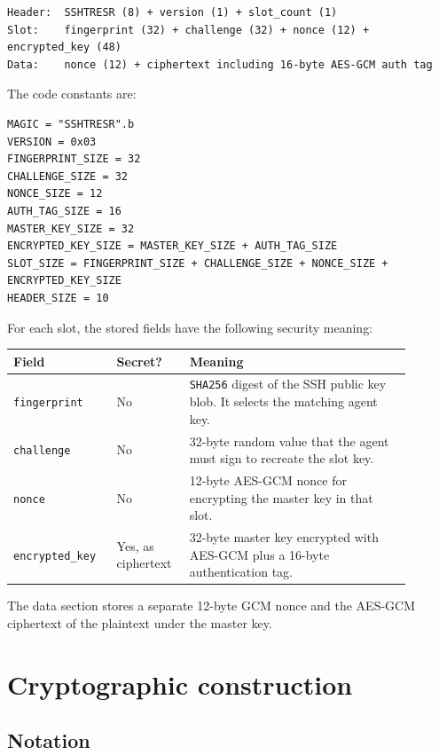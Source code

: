\documentclass[11pt]{article}
\theoremstyle{definition}
\theoremstyle{plain}
\begin{document}
\begin{lstlisting}[style=textcode]
Header:  SSHTRESR (8) + version (1) + slot_count (1)
Slot:    fingerprint (32) + challenge (32) + nonce (12) + encrypted_key (48)
Data:    nonce (12) + ciphertext including 16-byte AES-GCM auth tag
\end{lstlisting}

The code constants are:

\begin{lstlisting}[style=rubycode,caption={File-format constants from lib/ssh\_tresor/format.rb.}]
MAGIC = "SSHTRESR".b
VERSION = 0x03
FINGERPRINT_SIZE = 32
CHALLENGE_SIZE = 32
NONCE_SIZE = 12
AUTH_TAG_SIZE = 16
MASTER_KEY_SIZE = 32
ENCRYPTED_KEY_SIZE = MASTER_KEY_SIZE + AUTH_TAG_SIZE
SLOT_SIZE = FINGERPRINT_SIZE + CHALLENGE_SIZE + NONCE_SIZE + ENCRYPTED_KEY_SIZE
HEADER_SIZE = 10
\end{lstlisting}

For each slot, the stored fields have the following security meaning:

\begin{longtable}{p{0.23\linewidth}p{0.15\linewidth}p{0.51\linewidth}}
\toprule
Field & Secret? & Meaning \\
\midrule
\endhead
\texttt{fingerprint} & No & \texttt{SHA256} digest of the SSH public key blob. It selects the matching agent key. \\
\texttt{challenge} & No & 32-byte random value that the agent must sign to recreate the slot key. \\
\texttt{nonce} & No & 12-byte AES-GCM nonce for encrypting the master key in that slot. \\
\texttt{encrypted\_key} & Yes, as ciphertext & 32-byte master key encrypted with AES-GCM plus a 16-byte authentication tag. \\
\bottomrule
\end{longtable}

The data section stores a separate 12-byte GCM nonce and the AES-GCM ciphertext of the plaintext under the master key.

\section{Cryptographic construction}

\subsection{Notation}
\end{document}
